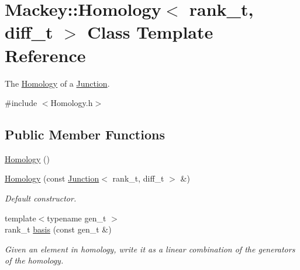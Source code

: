 \hypertarget{classMackey_1_1Homology}{}\section{Mackey\+:\+:Homology$<$ rank\+\_\+t, diff\+\_\+t $>$ Class Template Reference}
\label{classMackey_1_1Homology}


The \hyperlink{classMackey_1_1Homology}{Homology} of a \hyperlink{classMackey_1_1Junction}{Junction}.  




{\ttfamily \#include $<$Homology.\+h$>$}

\subsection*{Public Member Functions}
\begin{DoxyCompactItemize}
\item 
\hyperlink{classMackey_1_1Homology_a3580b194f986bd59a02fb84db97e00f2}{Homology} ()
\item 
\hyperlink{classMackey_1_1Homology_a31e26f0fb8e1cd7f0506ae1dbc97ea22}{Homology} (const \hyperlink{classMackey_1_1Junction}{Junction}$<$ rank\+\_\+t, diff\+\_\+t $>$ \&)
\begin{DoxyCompactList}\small\item\em Default constructor. \end{DoxyCompactList}\item 
{\footnotesize template$<$typename gen\+\_\+t $>$ }\\rank\+\_\+t \hyperlink{classMackey_1_1Homology_a3ef6bc9a9859c3711c11d153ba55b3e1}{basis} (const gen\+\_\+t \&)
\begin{DoxyCompactList}\small\item\em Given an element in homology, write it as a linear combination of the generators of the homology. \end{DoxyCompactList}\end{DoxyCompactItemize}
